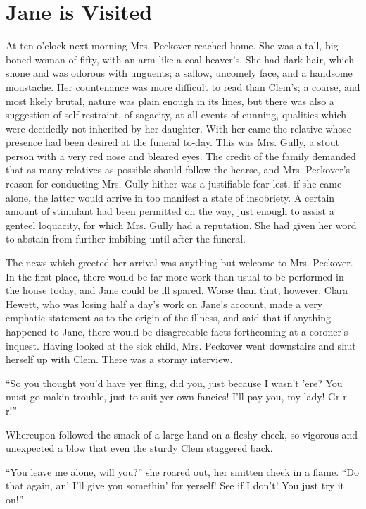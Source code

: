 \chapter {Jane is Visited}

At ten o'clock next morning Mrs. Peckover reached home. She was a tall,
big-boned woman of fifty, with an arm like a coal-heaver's. She had dark
hair, which shone and was odorous with unguents; a sallow, uncomely
face, and a handsome moustache. Her countenance was more difficult to
read than Clem's; a coarse, and most likely brutal, nature was plain
enough in its lines, but there was also a suggestion of self-restraint,
of sagacity, at all events of cunning, qualities which were decidedly
not inherited by her daughter. With her came the relative whose presence
had been desired at the funeral to-day. This was Mrs. Gully, a stout
person with a very red nose and bleared eyes. The
{\protect\hypertarget{93}{}{}}credit of the family demanded that as many
relatives as possible should follow the hearse, and Mrs. Peckover's
reason for conducting Mrs. Gully hither was a justifiable fear lest, if
she came alone, the latter would arrive in too manifest a state of
insobriety. A certain amount of stimulant had been permitted on the way,
just enough to assist a genteel loquacity, for which Mrs. Gully had a
reputation. She had given her word to abstain from further imbibing
until after the funeral.

The news which greeted her arrival was anything but welcome to Mrs.
Peckover. In the first place, there would be far more work than usual to
be performed in the house today, and Jane could be ill spared. Worse
than that, however. Clara Hewett, who was losing half a day's work on
Jane's account, made a very emphatic statement as to the origin of the
illness, and said that if anything happened to Jane, there would be
disagreeable facts forthcoming at a coroner's inquest. Having looked at
the sick child, Mrs. Peckover went downstairs and shut
{\protect\hypertarget{94}{}{}}herself up with Clem. There was a stormy
interview.

``So you thought you'd have yer fling, did you, just because I wasn't
'ere? You must go makin trouble, just to suit yer own fancies! I'll pay
you, my lady! Gr-r-r!''

Whereupon followed the smack of a large hand on a fleshy cheek, so
vigorous and unexpected a blow that even the sturdy Clem staggered back.

``You leave me alone, will you?'' she roared out, her smitten cheek in a
flame. ``Do that again, an' I'll give you somethin' for yerself! See if
I don't! You just try it on!''

